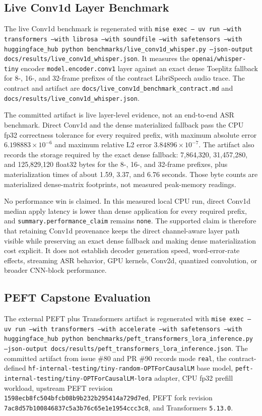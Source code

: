 \documentclass[11pt]{article}
\begin{document}
\subsection{Live Conv1d Layer Benchmark}

The live Conv1d benchmark is regenerated with \texttt{mise exec -- uv run
--with transformers --with librosa --with soundfile --with safetensors --with
huggingface\_hub python benchmarks/live\_conv1d\_whisper.py --json-output
docs/results/live\_conv1d\_whisper.json}. It measures the
\texttt{openai/whisper-tiny} encoder \texttt{model.encoder.conv1} layer
against an exact dense Toeplitz fallback for 8-, 16-, and 32-frame prefixes of
the contract LibriSpeech audio trace. The contract and artifact are
\texttt{docs/live\_conv1d\_benchmark\_contract.md} and
\texttt{docs/results/live\_conv1d\_whisper.json}.

The committed artifact is live layer-level evidence, not an end-to-end ASR
benchmark. Direct Conv1d and the dense materialized fallback pass the CPU fp32
correctness tolerance for every required prefix, with maximum absolute error
\(6.198883 \times 10^{-6}\) and maximum relative L2 error
\(3.84896 \times 10^{-7}\). The artifact also records the storage required by
the exact dense fallback: 7,864,320, 31,457,280, and 125,829,120 float32 bytes
for the 8-, 16-, and 32-frame prefixes, plus materialization times of about
1.59, 3.37, and 6.76 seconds. Those byte counts are materialized dense-matrix
footprints, not measured peak-memory readings.

No performance win is claimed. In this measured local CPU run, direct Conv1d
median apply latency is lower than dense application for every required
prefix, and \texttt{summary.performance\_claim} remains \texttt{none}. The
supported claim is therefore that retaining Conv1d provenance keeps the direct
channel-aware layer path visible while preserving an exact dense fallback and
making dense materialization cost explicit. It does not establish decoder
generation speed, word-error-rate effects, streaming ASR behavior, GPU
kernels, Conv2d, quantized convolution, or broader CNN-block performance.

\subsection{PEFT Capstone Evaluation}

The external PEFT plus Transformers artifact is regenerated with \texttt{mise
exec -- uv run --with transformers --with accelerate --with safetensors --with
huggingface\_hub python benchmarks/peft\_transformers\_lora\_inference.py
--json-output docs/results/peft\_transformers\_lora\_inference.json}. The
committed artifact from issue \#80 and PR \#90 records mode
\texttt{real}, the contract-defined
\texttt{hf-internal-testing/tiny-random-OPTForCausalLM} base model,
\texttt{peft-internal-testing/tiny-OPTForCausalLM-lora} adapter, CPU fp32
prefill workload, upstream PEFT revision
\texttt{1598ecb8fc504bfcb08b9b232b295414a729d7ed}, PEFT fork revision
\texttt{7ac8d57b100846837c5a3b76c65e1e1954ccc3c8}, and Transformers
\texttt{5.13.0}.
\end{document}
